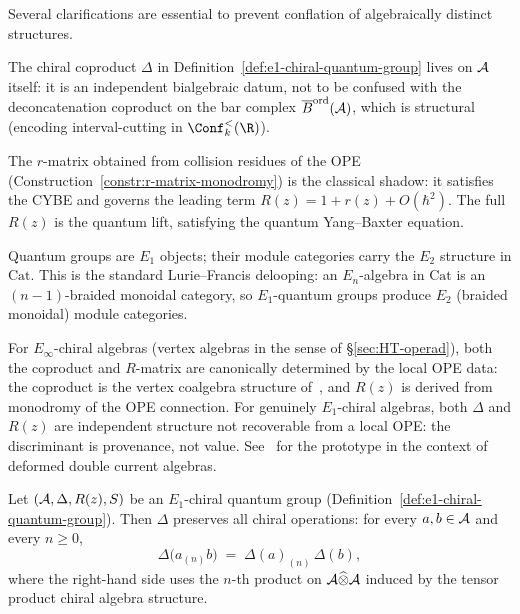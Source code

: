 \begin{remark}%
\label{rem:e1-chiral-qg-provenance}%
%
%
Several clarifications are essential to prevent
conflation of algebraically distinct structures.

The chiral coproduct $\Delta$ in
Definition~\ref{def:e1-chiral-quantum-group} lives on $\mathcal{A}$
itself: it is an independent bialgebraic datum, not to be
confused with the deconcatenation coproduct on the bar
complex $\overline{B}^{\mathrm{ord}}(\mathcal{A})$, which is structural (encoding
interval-cutting in $\Conf_k^<(\R)$).

The $r$-matrix obtained from collision residues of the OPE
(Construction~\ref{constr:r-matrix-monodromy}) is the
classical shadow: it satisfies the CYBE and governs the
leading term $R(z) = 1 + r(z) + O(\hbar^2)$. The full
$R(z)$ is the quantum lift, satisfying the quantum
Yang--Baxter equation.

Quantum groups are $E_1$ objects; their module categories
carry the $E_2$ structure in $\mathrm{Cat}$. This is the
standard Lurie--Francis delooping: an $E_n$-algebra in
$\mathrm{Cat}$ is an $(n{-}1)$-braided monoidal category,
so $E_1$-quantum groups produce $E_2$ (braided monoidal)
module categories.

For $E_\infty$-chiral algebras (vertex algebras in the sense
of \S\ref{sec:HT-operad}), both the coproduct and $R$-matrix
are canonically determined by the local OPE data: the
coproduct is the vertex coalgebra structure of~\cite{JKL26},
and $R(z)$ is derived from monodromy of the OPE connection.
For genuinely $E_1$-chiral algebras, both $\Delta$ and $R(z)$
are independent structure not recoverable from a local OPE: the
discriminant is provenance, not value.
See~\cite{GRZ23} for the prototype in the context of deformed
double current algebras.
\end{remark}

\begin{lemma}%
\label{lem:coproduct-bracket-compat}%
%
%
Let $(\mathcal{A}, \Delta, R(z), S)$ be an $E_1$-chiral quantum group
(Definition~\textup{\ref{def:e1-chiral-quantum-group}}). Then
$\Delta$ preserves all chiral operations: for every $a, b \in \mathcal{A}$
and every $n \ge 0$,
\begin{equation}\label{eq:coproduct-bracket-compat}
\Delta\bigl(a_{(n)}b\bigr)
\;=\;
\Delta(a)_{(n)}\,\Delta(b),
\end{equation}
where the right-hand side uses the $n$-th product on
$\mathcal{A} \widehat\otimes \mathcal{A}$ induced by the tensor product chiral
algebra structure.
\end{lemma}

